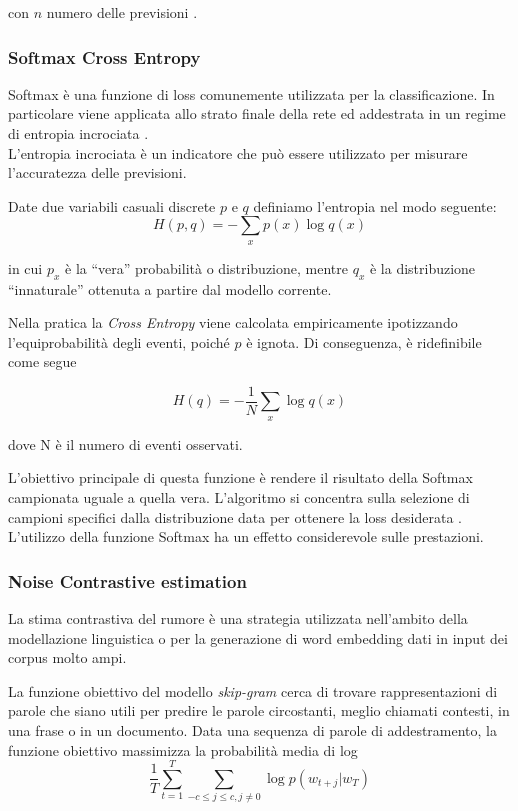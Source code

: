con $n$ numero delle previsioni \cite{wang2009mean}.

\subsubsection{Softmax Cross Entropy}
\label{subsubsec:sce}

Softmax è una funzione di loss comunemente utilizzata per la classificazione. In particolare viene applicata allo strato finale della rete ed addestrata in un regime di entropia incrociata \cite{tang2013deep}.\\
L'entropia incrociata è un indicatore che può essere utilizzato per misurare l'accuratezza delle previsioni. 

Date due variabili casuali discrete $p$ e $q$ definiamo l'entropia nel modo seguente:
\begin{equation}
	H(p,q)=-\sum_{x} p(x) \log q(x)
\end{equation}

in cui $p_{x}$ è la ``vera'' probabilità o distribuzione, mentre $q_{x}$ è la distribuzione ``innaturale'' ottenuta a partire dal modello corrente.

Nella pratica la \emph{Cross Entropy} viene calcolata empiricamente ipotizzando l'equiprobabilità degli eventi, poiché $p$ è ignota. 
Di conseguenza, è ridefinibile come segue

\begin{equation}
H(q)=-\frac{1}{N}\sum_{x} \log q(x)
\end{equation}

dove N è il numero di eventi osservati.

L'obiettivo principale di questa funzione è rendere il risultato della Softmax campionata uguale a quella vera. L'algoritmo si concentra sulla selezione di campioni specifici dalla distribuzione data per ottenere la loss desiderata \cite{liu2016large}.  
L'utilizzo della funzione Softmax ha un effetto considerevole sulle prestazioni. 

\subsubsection{Noise Contrastive estimation}
\label{subsubsec:nce}

La stima contrastiva del rumore è una strategia utilizzata nell'ambito della modellazione linguistica o per la generazione di word embedding dati in input dei corpus molto ampi.

La funzione obiettivo del modello \emph{skip-gram} cerca di trovare rappresentazioni di parole che siano utili per predire le parole circostanti, meglio chiamati contesti, in una frase o in un documento. 
Data una sequenza di parole di addestramento, la funzione obiettivo massimizza la probabilità media di log
\begin{equation}
\frac{1}{T}\sum_{t=1}^{T} \sum_{-c \leq j \leq c, j \neq 0} \log p(w_{t+j} | w_T)
\end{equation}

